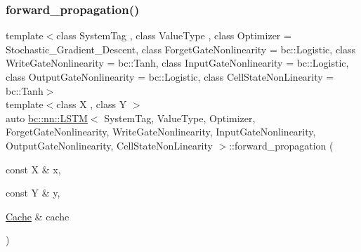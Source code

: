\mbox{\label{structbc_1_1nn_1_1LSTM_a1b3698141f27e32587a7c1ed367df095}} 
\subsubsection{\texorpdfstring{forward\+\_\+propagation()}{forward\_propagation()}}
{\footnotesize\ttfamily template$<$class System\+Tag , class Value\+Type , class Optimizer  = Stochastic\+\_\+\+Gradient\+\_\+\+Descent, class Forget\+Gate\+Nonlinearity  = bc\+::\+Logistic, class Write\+Gate\+Nonlinearity  = bc\+::\+Tanh, class Input\+Gate\+Nonlinearity  = bc\+::\+Logistic, class Output\+Gate\+Nonlinearity  = bc\+::\+Logistic, class Cell\+State\+Non\+Linearity  = bc\+::\+Tanh$>$ \\
template$<$class X , class Y $>$ \\
auto \hyperlink{structbc_1_1nn_1_1LSTM}{bc\+::nn\+::\+L\+S\+TM}$<$ System\+Tag, Value\+Type, Optimizer, Forget\+Gate\+Nonlinearity, Write\+Gate\+Nonlinearity, Input\+Gate\+Nonlinearity, Output\+Gate\+Nonlinearity, Cell\+State\+Non\+Linearity $>$\+::forward\+\_\+propagation (\begin{DoxyParamCaption}\item[{const X \&}]{x,  }\item[{const Y \&}]{y,  }\item[{\hyperlink{structbc_1_1nn_1_1Cache}{Cache} \&}]{cache }\end{DoxyParamCaption})\hspace{0.3cm}{\ttfamily [inline]}}

\mbox{\label{structbc_1_1nn_1_1LSTM_ae85ec6a90fe555a1088681159a0af466}} 

